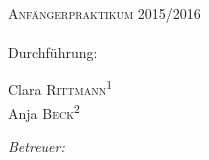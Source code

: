 \begin{titlepage}
	\par
	\hfill
	\par
\begin{center}
\ \\
[6cm]	
	\textsc{\Huge Anfängerpraktikum 2015/2016} \\
[2cm]
	\Huge\textbf{\Versuch} \\
[1cm]
	{\large Durchführung: \Tag} \\
	\Korrektur
[5cm]
\begin{minipage}{0.4\textwidth}
	\begin{flushleft} \large
		Clara \textsc{Rittmann}\textsuperscript{1} \\
		Anja \textsc{Beck}\textsuperscript{2}
	\end{flushleft}
\end{minipage}
\hfill
\begin{minipage}{0.4\textwidth}
	\begin{flushright} \large
		\emph{Betreuer:} \\
		\Betreuer
	\end{flushright}
\end{minipage}
\end{center}
\end{titlepage}